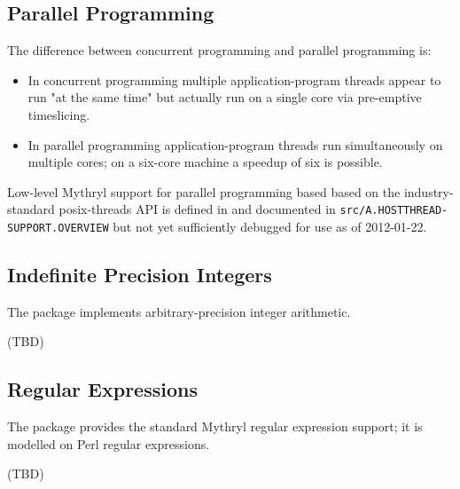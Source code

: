 \cutend*

\subsection{Parallel Programming}
\label{section:tut:topic:parallel-programming}

The difference between concurrent programming and parallel programming is: 
\begin{itemize}

\item 
In concurrent programming multiple application-program threads appear to run 
"at the same time" but actually run on a single core via pre-emptive timeslicing. 

\item 
In parallel programming application-program threads run simultaneously on 
multiple cores;  on a six-core machine a speedup of six is possible. 
\end{itemize}

Low-level Mythryl support for parallel programming based 
based on the industry-standard posix-threads API is defined in 
 and 
documented in {\tt src/A.HOSTTHREAD-SUPPORT.OVERVIEW} but not yet sufficiently 
debugged for use as of 2012-01-22. 

\cutend*

\subsection{Indefinite Precision Integers}
\label{section:tut:topic:integer}

The  package implements arbitrary-precision integer 
arithmetic.

(TBD)

\cutend*

\subsection{Regular Expressions}
\label{section:tut:topic:regex}

The  package provides the standard Mythryl 
regular expression support;  it is modelled on Perl regular expressions.

(TBD)

\cutend*

